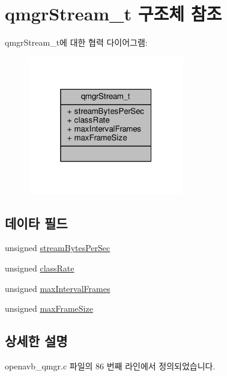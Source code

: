 \hypertarget{structqmgr_stream__t}{}\section{qmgr\+Stream\+\_\+t 구조체 참조}
\label{structqmgr_stream__t}


qmgr\+Stream\+\_\+t에 대한 협력 다이어그램\+:
\nopagebreak
\begin{figure}[H]
\begin{center}
\leavevmode
\includegraphics[width=193pt]{structqmgr_stream__t__coll__graph}
\end{center}
\end{figure}
\subsection*{데이타 필드}
\begin{DoxyCompactItemize}
\item 
unsigned \hyperlink{structqmgr_stream__t_aa205bb2199ec3081785cc701ae7da809}{stream\+Bytes\+Per\+Sec}
\item 
unsigned \hyperlink{structqmgr_stream__t_af50080087f14150fb5d5fdc484ca79f5}{class\+Rate}
\item 
unsigned \hyperlink{structqmgr_stream__t_aa49daeac307e6a8205c5d418a78d84d6}{max\+Interval\+Frames}
\item 
unsigned \hyperlink{structqmgr_stream__t_ab3d51dcd6637a6348d70a58a420d7d82}{max\+Frame\+Size}
\end{DoxyCompactItemize}


\subsection{상세한 설명}


openavb\+\_\+qmgr.\+c 파일의 86 번째 라인에서 정의되었습니다.



